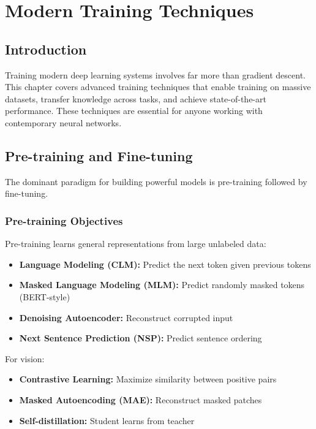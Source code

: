 \clearpage
\cleardoublepage

\chapter{Modern Training Techniques}

\section{Introduction}

Training modern deep learning systems involves far more than gradient descent. This chapter covers advanced training techniques that enable training on massive datasets, transfer knowledge across tasks, and achieve state-of-the-art performance. These techniques are essential for anyone working with contemporary neural networks.

\section{Pre-training and Fine-tuning}

The dominant paradigm for building powerful models is pre-training followed by fine-tuning.

\subsection{Pre-training Objectives}

Pre-training learns general representations from large unlabeled data:

\begin{itemize}
    \item \textbf{Language Modeling (CLM):} Predict the next token given previous tokens
    \item \textbf{Masked Language Modeling (MLM):} Predict randomly masked tokens (BERT-style) \cite{devlin2018bert}
    \item \textbf{Denoising Autoencoder:} Reconstruct corrupted input
    \item \textbf{Next Sentence Prediction (NSP):} Predict sentence ordering
\end{itemize}

For vision:
\begin{itemize}
    \item \textbf{Contrastive Learning:} Maximize similarity between positive pairs \cite{chen2020simple}
    \item \textbf{Masked Autoencoding (MAE):} Reconstruct masked patches \cite{he2022masked}
    \item \textbf{Self-distillation:} Student learns from teacher
\end{itemize}

